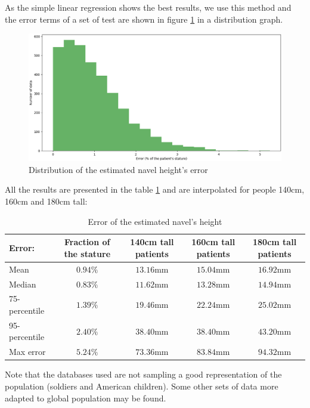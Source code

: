 \documentclass{article}
\begin{document}
As the simple linear regression shows the best results, we use this method and the error terms of a set of test are shown in figure \ref{fig:distrib_estimated_navel} in a distribution graph.

\begin{figure}[H]
    \centering
    \includegraphics[width=12cm]{images/navel/estimation/distrib_estimated_navel.png}
    \caption{Distribution of the estimated navel height's error}
    \label{fig:distrib_estimated_navel}
\end{figure}

All the results are presented in the table \ref{tab:results_error_estimated_navel} and are interpolated for people 140cm, 160cm and 180cm tall:

\begin{table}[H]
    \centering
    \begin{tabular}{|l|c|c|c|c|}
        \hline 
        Error: & Fraction of the stature & 140cm tall patients & 160cm tall patients & 180cm tall patients 
        \\ \hline
        Mean & $0.94\%$ & $13.16$mm & $15.04$mm & $16.92$mm 
        \\ \hline
        Median & $0.83\%$ & $11.62$mm & $13.28$mm & $14.94$mm 
        \\ \hline
        75-percentile & $1.39\%$ & $19.46$mm & $22.24$mm & $25.02$mm 
        \\ \hline
        95-percentile & $2.40\%$ & $38.40$mm & $38.40$mm & $43.20$mm 
        \\ \hline
        Max error & $5.24\%$ & $73.36$mm & $83.84$mm & $94.32$mm 
        \\ \hline 
    \end{tabular}
    \caption{Error of the estimated navel's height}
    \label{tab:results_error_estimated_navel}
\end{table}

Note that the databases used are not sampling a good representation of the population (soldiers and American children). Some other sets of data more adapted to global population may be found. 
\end{document}
